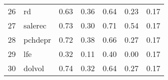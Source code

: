 \documentclass[12pt]{article}
\begin{document}
\begin{footnotesize}
\begin{longtable}{rl|c|c|c|c|c}
				26                   & rd                          & 0.63                             & 0.36                                                                                          & 0.64                                                                                          & 0.23                                                                                          & 0.17                                                                                                   \\
				27                   & salerec                     & 0.73                             & 0.30                                                                                          & 0.71                                                                                          & 0.54                                                                                          & 0.17                                                                                                   \\
				28                   & pchdepr                     & 0.72                             & 0.38                                                                                          & 0.66                                                                                          & 0.27                                                                                          & 0.17                                                                                                   \\
				29                   & lfe                         & 0.32                             & 0.11                                                                                          & 0.40                                                                                          & 0.00                                                                                          & 0.17                                                                                                   \\
				30                   & dolvol                      & 0.74                             & 0.32                                                                                          & 0.64                                                                                          & 0.27                                                                                          & 0.17                                                                                                   \\

\end{longtable}
\end{footnotesize}
\end{document}
